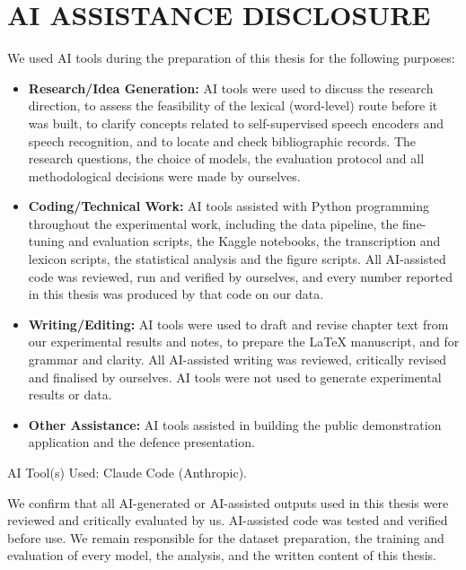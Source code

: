 \chapter*{AI ASSISTANCE DISCLOSURE}

We used AI tools during the preparation of this thesis for the following
purposes:

\begin{itemize}[leftmargin=1.2em]
  \item \textbf{Research/Idea Generation:} AI tools were used to discuss the
    research direction, to assess the feasibility of the lexical (word-level)
    route before it was built, to clarify concepts related to self-supervised
    speech encoders and speech recognition, and to locate and check
    bibliographic records. The research questions, the choice of models, the
    evaluation protocol and all methodological decisions were made by ourselves.
  \item \textbf{Coding/Technical Work:} AI tools assisted with Python
    programming throughout the experimental work, including the data pipeline,
    the fine-tuning and evaluation scripts, the Kaggle notebooks, the
    transcription and lexicon scripts, the statistical analysis and the figure
    scripts. All AI-assisted code was reviewed, run and verified by ourselves,
    and every number reported in this thesis was produced by that code on our
    data.
  \item \textbf{Writing/Editing:} AI tools were used to draft and revise chapter
    text from our experimental results and notes, to prepare the \LaTeX{}
    manuscript, and for grammar and clarity. All AI-assisted writing was
    reviewed, critically revised and finalised by ourselves. AI tools were not
    used to generate experimental results or data.
  \item \textbf{Other Assistance:} AI tools assisted in building the public
    demonstration application and the defence presentation.
\end{itemize}

\noindent AI Tool(s) Used: Claude Code (Anthropic).

\medskip
\noindent We confirm that all AI-generated or AI-assisted outputs used in this
thesis were reviewed and critically evaluated by us. AI-assisted code was tested
and verified before use. We remain responsible for the dataset preparation, the
training and evaluation of every model, the analysis, and the written content of
this thesis.
